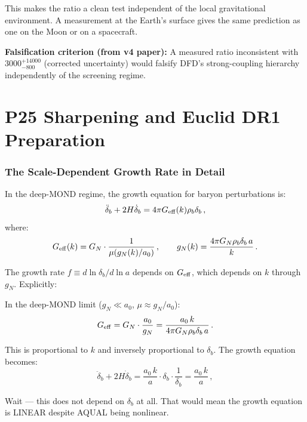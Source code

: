 \documentclass[11pt]{article}
\newcommand{\Geff}{G_{\rm eff}}
\newcommand{\aM}{a_0}
\begin{document}
This makes the ratio a clean test independent of the local gravitational
environment.  A measurement at the Earth's surface gives the same
prediction as one on the Moon or on a spacecraft.

\textbf{Falsification criterion (from v4 paper):}
A measured ratio inconsistent with $3000^{+14000}_{-800}$ (corrected
uncertainty) would falsify DFD's strong-coupling hierarchy independently
of the screening regime.


\part{P25 Sharpening and Euclid DR1 Preparation}

\section{The Scale-Dependent Growth Rate in Detail}

In the deep-MOND regime, the growth equation for baryon perturbations is:
\begin{equation}
\ddot\delta_b + 2H\dot\delta_b = 4\pi\Geff(k)\rho_b\delta_b\,,
\end{equation}
where:
\begin{equation}
\Geff(k) = G_N\cdot\frac{1}{\mu(g_N(k)/\aM)}\,,\qquad
g_N(k) = \frac{4\pi G_N\rho_b\delta_b\,a}{k}\,.
\end{equation}

The growth rate $f \equiv d\ln\delta_b/d\ln a$ depends on $\Geff$, which
depends on $k$ through $g_N$.  Explicitly:

In the deep-MOND limit ($g_N \ll \aM$, $\mu \approx g_N/\aM$):
\begin{equation}
\Geff = G_N\cdot\frac{\aM}{g_N} = \frac{\aM\,k}{4\pi G_N\rho_b\delta_b\,a}\,.
\end{equation}

This is proportional to $k$ and inversely proportional to $\delta_b$.
The growth equation becomes:
\begin{equation}
\ddot\delta_b + 2H\dot\delta_b = \frac{\aM\,k}{a}\cdot\delta_b\cdot
\frac{1}{\delta_b} = \frac{\aM\,k}{a}\,,
\end{equation}

Wait --- this does not depend on $\delta_b$ at all.  That would mean the
growth equation is LINEAR despite AQUAL being nonlinear.
\end{document}
